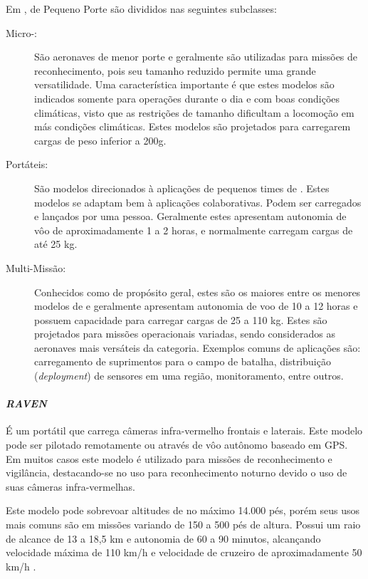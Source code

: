 Em \cite{Drew2005}, \vants de Pequeno Porte são divididos nas seguintes subclasses:

\begin{description}

\item[Micro-\vants: ]
São aeronaves de menor porte e geralmente são utilizadas para missões de reconhecimento, pois seu tamanho reduzido permite uma grande versatilidade. Uma característica importante é que estes modelos são indicados somente para operações durante o dia e com boas condições climáticas, visto que as restrições de tamanho dificultam a locomoção em más condições climáticas. Estes modelos são projetados para carregarem cargas de peso inferior a 200g.

\item[Portáteis: ]
São modelos direcionados à aplicações de pequenos times de \vants. Estes modelos se adaptam bem à aplicações colaborativas. Podem ser carregados e lançados por uma pessoa. Geralmente estes \vants apresentam autonomia de vôo de aproximadamente 1 a 2 horas, e normalmente carregam cargas de até 25 kg.

\item[Multi-Missão: ]
Conhecidos como \vants  de propósito geral, estes são os maiores entre os menores modelos de \vants e geralmente apresentam autonomia de voo de 10 a 12 horas e possuem capacidade para carregar cargas de 25 a 110 kg. Estes \vants são projetados para missões operacionais variadas, sendo considerados as aeronaves mais versáteis da categoria. Exemplos comuns de aplicações são: carregamento de suprimentos para o campo de batalha, distribuição (\emph{deployment}) de sensores em uma região, monitoramento, entre outros.

\end{description}


\paragraph{\emph{RAVEN}}
É um \vant portátil que carrega câmeras infra-vermelho frontais e laterais. Este modelo pode ser pilotado remotamente ou através de vôo autônomo baseado em GPS. Em muitos casos 
este modelo é utilizado para missões de reconhecimento e vigilância, destacando-se no uso para reconhecimento noturno devido o uso de suas câmeras infra-vermelhas.

Este modelo pode sobrevoar altitudes de no máximo 14.000 pés, porém seus usos mais comuns são em missões variando de 150 a 500 pés de altura. Possui um raio de alcance de 
13 a 18,5 km e autonomia de 60 a 90 minutos, alcançando velocidade máxima de 110 km/h e velocidade de cruzeiro de aproximadamente 50 km/h \cite{uas_2009}. 

